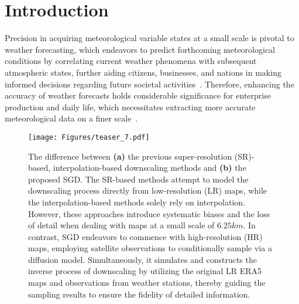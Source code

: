 \section{Introduction}
\label{sec:intro}

Precision in acquiring meteorological variable states at a small scale is pivotal to weather forecasting, which endeavors to predict forthcoming meteorological conditions by correlating current weather phenomena with subsequent atmospheric states, further aiding citizens, businesses, and nations in making informed decisions regarding future societal activities~\cite{mukkavilli2023ai,chen2023foundation,li2024deepphysinet}. 
Therefore, enhancing the accuracy of weather forecasts holds considerable significance for enterprise production and daily life, which necessitates extracting more accurate meteorological data on a finer scale~\cite{liu2024deriving,liu2024mambads}.

\begin{figure}[t]
    \centering
\texttt{[image: Figures/teaser\_7.pdf]}
    \vspace{-1.6cm}
    \caption{
    The difference between \textbf{(a)} the previous super-resolution (SR)-based, interpolation-based downscaling methods and \textbf{(b)} the proposed  SGD. 
    The SR-based methods attempt to model the downscaling process directly from low-resolution (LR) maps, while the interpolation-based methods solely rely on interpolation.
    However, these approaches introduce systematic biases and the loss of detail when dealing with maps at a small scale of $6.25km$. 
    In contrast, SGD endeavors to commence with high-resolution (HR) maps, employing satellite observations to conditionally sample via a diffusion model. 
    Simultaneously, it simulates and constructs the inverse process of downscaling by utilizing the original LR ERA5 maps and observations from weather stations, thereby guiding the sampling results to ensure the fidelity of detailed information. }
    \label{fig:teaser}
\vspace{-0.5cm}
\end{figure}

